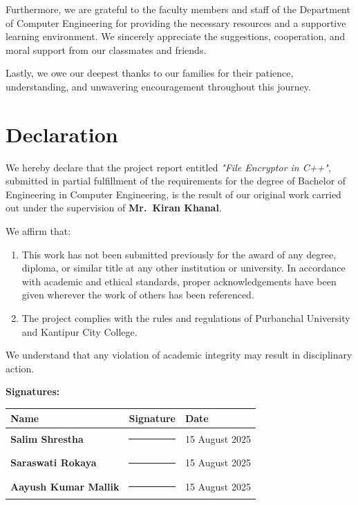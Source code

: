 \documentclass[12pt, a4paper]{report}
\begin{document}
Furthermore, we are grateful to the faculty members and staff of the Department of Computer
Engineering for providing the necessary resources and a supportive learning environment. We
sincerely appreciate the suggestions, cooperation, and moral support from our classmates and
friends.

Lastly, we owe our deepest thanks to our families for their patience, understanding, and
unwavering encouragement throughout this journey.

\newpage

\chapter*{Declaration}

We hereby declare that the project report entitled \textit{"File Encryptor in C++"}, submitted
in partial fulfillment of the requirements for the degree of Bachelor of Engineering in
Computer Engineering, is the result of our original work carried out under the supervision of
\textbf{Mr.~Kiran Khanal}.

We affirm that:

\begin{enumerate}
  \item This work has not been submitted previously for the award of any degree, diploma, or
        similar title at any other institution or university. In accordance with academic and
        ethical standards, proper acknowledgements have been given wherever the work of
        others has been referenced.

  \item The project complies with the rules and regulations of Purbanchal University and
        Kantipur City College.
\end{enumerate}

We understand that any violation of academic integrity may result in disciplinary action.

\vspace{1.5cm}

\textbf{Signatures:}

\vspace{0.5cm}

\begin{tabular}{>{\bfseries}p{5cm} p{4cm} p{3.5cm}}
  \toprule
  Name & Signature & Date \\
  \midrule
  Salim Shrestha    & \rule{3cm}{0.4pt} & 15 August 2025 \\[0.8cm]
  Saraswati Rokaya  & \rule{3cm}{0.4pt} & 15 August 2025 \\[0.8cm]
  Aayush Kumar Mallik & \rule{3cm}{0.4pt} & 15 August 2025 \\
  \bottomrule
\end{tabular}
\end{document}
